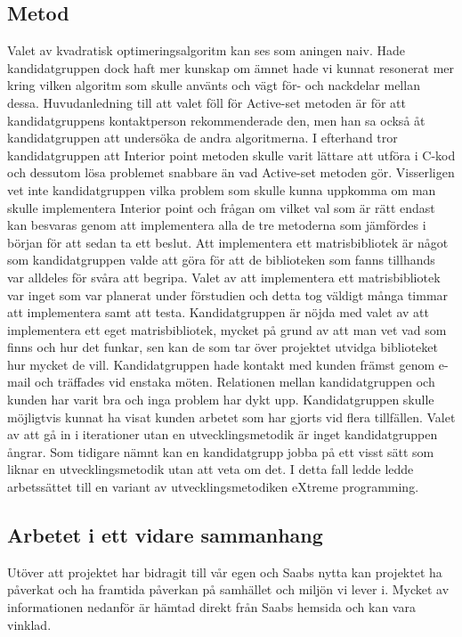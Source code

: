 \subsection{Metod}
Valet av kvadratisk optimeringsalgoritm kan ses som aningen naiv. Hade kandidatgruppen dock haft mer kunskap om ämnet hade vi kunnat resonerat mer kring vilken algoritm som skulle använts och vägt för- och nackdelar mellan dessa. Huvudanledning till att valet föll för Active-set metoden är för att kandidatgruppens kontaktperson rekommenderade den, men han sa också åt kandidatgruppen att undersöka de andra algoritmerna. I efterhand tror kandidatgruppen att Interior point metoden skulle varit lättare att utföra i C-kod och dessutom lösa problemet snabbare än vad Active-set metoden gör. Visserligen vet inte kandidatgruppen vilka problem som skulle kunna uppkomma om man skulle implementera Interior point och frågan om vilket val som är rätt endast kan besvaras genom att implementera alla de tre metoderna som jämfördes i början för att sedan ta ett beslut.
\newline
\newline
Att implementera ett matrisbibliotek är något som kandidatgruppen valde att göra för att de biblioteken som fanns tillhands var alldeles för svåra att begripa. Valet av att implementera ett matrisbibliotek var inget som var planerat under förstudien och detta tog väldigt många timmar att implementera samt att testa. Kandidatgruppen är nöjda med valet av att implementera ett eget matrisbibliotek, mycket på grund av att man vet vad som finns och hur det funkar, sen kan de som tar över projektet utvidga biblioteket hur mycket de vill.
\newline
\newline
Kandidatgruppen hade kontakt med kunden främst genom e-mail och träffades vid enstaka möten. Relationen mellan kandidatgruppen och kunden har varit bra och inga problem har dykt upp. Kandidatgruppen skulle möjligtvis kunnat ha visat kunden arbetet som har gjorts vid flera tillfällen. 
\newline
\newline
Valet av att gå in i iterationer utan en utvecklingsmetodik är inget kandidatgruppen ångrar. Som tidigare nämnt kan en kandidatgrupp jobba på ett visst sätt som liknar en utvecklingsmetodik utan att veta om det. I detta fall ledde ledde arbetssättet till en variant av utvecklingsmetodiken eXtreme programming.

\subsection{Arbetet i ett vidare sammanhang}
Utöver att projektet har bidragit till vår egen och Saabs nytta kan projektet ha påverkat och ha framtida påverkan på samhället och miljön vi lever i. Mycket av informationen nedanför är hämtad direkt från Saabs hemsida och kan vara vinklad.   

